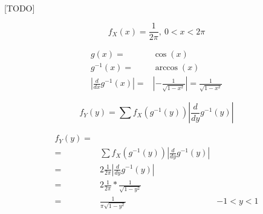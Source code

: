 \documentclass{article}
\begin{document}
    \paragraph{}
    [TODO]


    \begin{equation}
      f_X(x) = \frac{1}{2\pi}, \ 0 < x < 2\pi
    \end{equation}


    \begin{align}
      g(x) =& \cos(x) \\
      g^{-1}(x) =& \arccos(x) \\
      \left| \frac{d}{dx} g^{-1} (x) \right| =& \left| - \frac{1}{\sqrt{1-x^2}} \right| =  \frac{1}{\sqrt{1-x^2}}
    \end{align}

    \begin{equation}
    \label{eq:density_transformation_technique}
      f_Y (y) = \sum f_X \left( g^{-1} (y) \right) \left| \frac{d}{dy} g^{-1} (y) \right|
    \end{equation}

    \begin{figure}
      \center
      \caption{}
      \label{}
    \end{figure}

    \begin{align}
      f_Y (y) =& &\\
              =& \sum f_X \left( g^{-1} (y) \right) \left| \frac{d}{dy} g^{-1} (y) \right| &\\
              =& 2\frac{1}{2\pi} \left| \frac{d}{dy} g^{-1} (y) \right| &\\
              =& 2\frac{1}{2\pi}*\frac{1}{\sqrt{1-y^2}} &\\
              =& \frac{1}{\pi\sqrt{1-y^2}} & -1<y<1
    \end{align}
  \nocite{prob2017}

  
  
\end{document}
